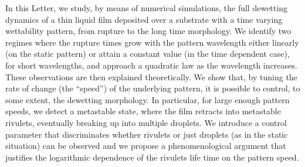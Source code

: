 In this Letter, we study, by means of numerical simulations, the full dewetting dynamics of a thin liquid film deposited over a substrate with a time varying wettability pattern, from rupture to the long time morphology. 
We identify two regimes where the rupture times grow with the pattern wavelength either linearly (on the static pattern) or attain a constant value (in the time dependent case), for short wavelengths, and approach a quadratic law as the wavelength increases. 
These observations are then explained theoretically.
We show that, by tuning the rate of change (the ``speed'') of the underlying pattern, it is possible to control, to some extent, the dewetting morphology. 
In particular, for large enough pattern speeds, we detect a metastable state, where the film retracts into metastable rivulets, eventually breaking up into multiple droplets.
We introduce a control parameter that discriminates whether rivulets or just droplets (as in the static situation) can be observed and we propose a phenomenological argument that justifies the logarithmic dependence of the rivulets life time on the pattern speed.

